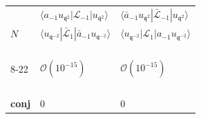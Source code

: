 \documentclass[a4paper,10pt]{article}
\newcommand{\q}{\mathfrak{q}}
\begin{document}
\begin{table}[H]
\center
\begin{minipage}{.5\textwidth}
\center

\begin{tabular}{lll}
 \vspace*{5pt}    & $\langle a_{-1}u_{\q^2} | {\mathcal L}_{-1} | u_{\q^2} \rangle$  & $\langle \bar{a}_{-1}u_{\q^2} |\bar{\mathcal L}_{-1}| u_{\q^2} \rangle$    \\
   $N$  & $\langle u_{\q^{-2}} |\bar{\mathcal L}_{1}| \bar{a}_{-1}u_{\q^{-2}} \rangle$     & $\langle u_{\q^{-2}}| {\mathcal L}_{1} | a_{-1}u_{\q^{-2}} \rangle$   \\
\hline
 \\
  \\
   \\
   \\
8-22 &$ \mathcal{O}(10^{-15})$&$ \mathcal{O}(10^{-15})$\\
\\
 \\
  \\
  \\
 \bf{conj}  & 0  & 0    \\
\hline
\end{tabular}
\end{minipage}%
\begin{minipage}{.5\textwidth}
\center


\end{minipage}
\end{table}
\end{document}
